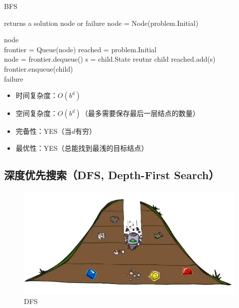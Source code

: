 \begin{algorithm}[H]
    \caption{BFS}
    \begin{algorithmic}[1]
         returns a solution node or failure
        \State node = Node(problem.Initial)

        \State \Return node
        \EndIf
        \\
        \State frontier = Queue(node)
        \State reached = {problem.Initial}
        \\
        \State node = frontier.dequeue()
        \State s = child.State
        \State reutnr child
        \EndIf
        \State reached.add(s)
        \State frontier.enqueue(child)
        \EndIf
        \EndFor
        \EndWhile
        \\
        \State \Return failure
        \EndProcedure
    \end{algorithmic}
\end{algorithm}

\begin{itemize}
    \item 时间复杂度：$ O(b^d) $
    \item 空间复杂度：$ O(b^d) $（最多需要保存最后一层结点的数量）
    \item 完备性：YES（当$ d $有穷）
    \item 最优性：YES（总能找到最浅的目标结点）
\end{itemize}

\vspace{0.5cm}

\subsection{深度优先搜索（DFS, Depth-First Search）}

\begin{figure}[H]
    \centering
    \includegraphics{img/C1/1-4/2.png}
    \caption{DFS}
\end{figure}

